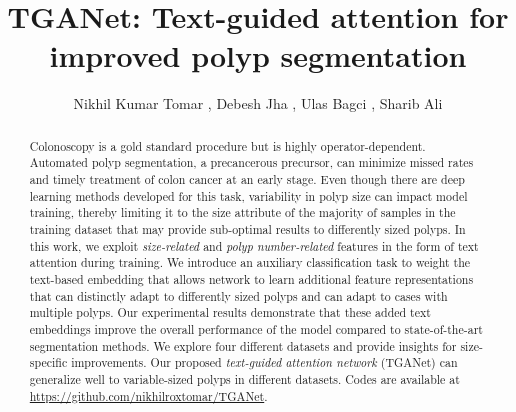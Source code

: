 \documentclass[runningheads]{llncs}
\begin{document}
\title{TGANet: Text-guided attention for improved polyp segmentation}

\author{Nikhil Kumar Tomar , Debesh Jha , Ulas Bagci , Sharib Ali }



\maketitle      
\begin{abstract}
Colonoscopy is a gold standard procedure but is highly operator-dependent. Automated polyp segmentation, a precancerous precursor, can minimize missed rates and timely treatment of colon cancer at an early stage. Even though there are deep learning methods developed for this task, variability in polyp size can impact model training, thereby limiting it to the size attribute of the majority of samples in the training dataset that may provide sub-optimal results to differently sized polyps. In this work, we exploit \textit{size-related} and \textit{polyp number-related} features in the form of text attention during training. We introduce an auxiliary classification task to weight the text-based embedding that allows network to learn additional feature representations that can distinctly adapt to differently sized polyps and can adapt to cases with multiple polyps. Our experimental results demonstrate that these added text embeddings improve the overall performance of the model compared to state-of-the-art segmentation methods. We explore four different datasets and provide insights for size-specific improvements. Our proposed \textit{text-guided attention network} (TGANet) can generalize well to variable-sized polyps in different datasets. Codes are available at \url{https://github.com/nikhilroxtomar/TGANet}.



\end{abstract}
\end{document}
